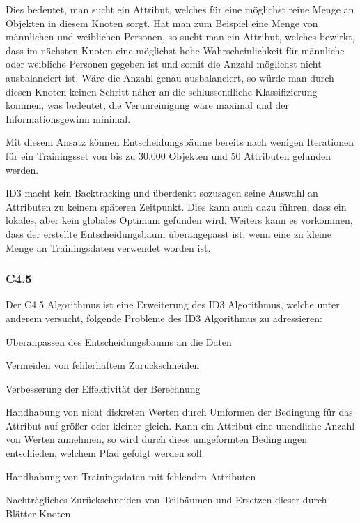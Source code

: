 Dies bedeutet, man sucht ein Attribut, welches für eine möglichst reine Menge an Objekten in diesem Knoten sorgt. Hat man zum Beispiel eine Menge von männlichen und weiblichen Personen, so sucht man ein Attribut, welches bewirkt, dass im nächsten Knoten eine möglichst hohe Wahrscheinlichkeit für männliche oder weibliche Personen gegeben ist und somit die Anzahl möglichst nicht ausbalanciert ist. Wäre die Anzahl genau ausbalanciert, so würde man durch diesen Knoten keinen Schritt näher an die schlussendliche Klassifizierung kommen, was bedeutet, die Verunreinigung wäre maximal und der Informationsgewinn minimal.

Mit diesem Ansatz können Entscheidungsbäume bereits nach wenigen Iterationen für ein Trainingsset von bis zu 30.000 Objekten und 50 Attributen gefunden werden. \cite{john_ross_quinlan_1986}

ID3 macht kein Backtracking und überdenkt sozusagen seine Auswahl an Attributen zu keinem späteren Zeitpunkt. Dies kann auch dazu führen, dass ein lokales, aber kein globales Optimum gefunden wird. \cite{howard_hamilton_machine_2009} Weiters kann es vorkommen, dass der erstellte Entscheidungsbaum überangepasst ist, wenn eine zu kleine Menge an Trainingsdaten verwendet worden ist. \cite{rapidminer_rapidminer_2015}

\subsubsection{C4.5}
Der C4.5 Algorithmus ist eine Erweiterung des ID3 Algorithmus, welche unter anderem versucht, folgende Probleme des ID3 Algorithmus zu adressieren:  \cite{howard_hamilton_machine_2009}

\begin{pitemize}
\item Überanpassen des Entscheidungsbaums an die Daten
\item Vermeiden von fehlerhaftem Zurückschneiden
\item Verbesserung der Effektivität der Berechnung
\item Handhabung von nicht diskreten Werten durch Umformen der Bedingung für das Attribut auf  größer oder kleiner gleich. Kann ein Attribut eine unendliche Anzahl von Werten annehmen, so wird durch diese umgeformten Bedingungen entschieden, welchem Pfad gefolgt werden soll.
\item Handhabung von Trainingsdaten mit fehlenden Attributen
\item Nachträgliches Zurückschneiden von Teilbäumen und Ersetzen dieser durch Blätter-Knoten
\end{pitemize}

